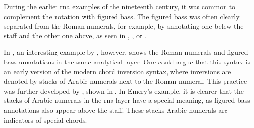 
During the earlier \gls{rna} examples of the nineteenth
century, it was common to complement the notation with
figured bass. The figured bass was often clearly separated
from the Roman numerals, for example, by annotating one
below the staff and the other one above, as seen in
,
, or
.

In , an
interesting example by \textcite{bussler1878praktische},
however, shows the Roman numerals and figured bass
annotations in the same analytical layer. One could argue
that this syntax is an early version of the modern chord
inversion syntax, where inversions are denoted by stacks of
Arabic numerals next to the Roman numeral. This practice was
further developed by \textcite{emery1879elements}, shown in
. In Emery's
example, it is clearer that the stacks of Arabic numerals in
the \gls{rna} layer have a special meaning, as figured bass
annotations also appear above the staff. These stacks Arabic
numerals are indicators of special chords.

